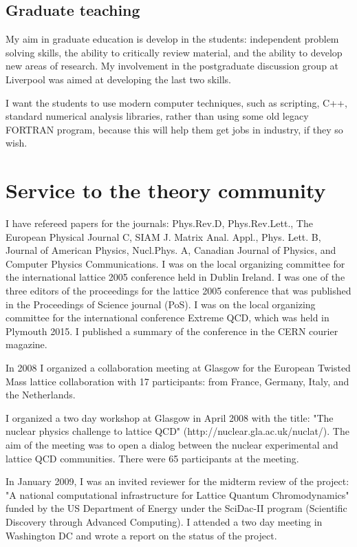 \documentclass[12pt]{article}
\begin{document}
\subsection{Graduate teaching}

My aim in graduate education is develop in the students:
independent problem solving skills, 
the ability to critically review material, and 
the ability to develop new areas of research. My 
involvement in the postgraduate discussion group at Liverpool
was aimed at developing the last two skills.

I want the students to use modern computer
techniques, such as scripting, C++, standard numerical
analysis libraries, rather than using some old legacy
FORTRAN program, because this will help them 
get jobs in industry, if they so wish.



\section{Service to the theory community}

I have refereed papers for the journals: Phys.Rev.D, Phys.Rev.Lett.,
The European Physical Journal C, SIAM J. Matrix Anal. Appl.,
Phys. Lett. B, Journal of American Physics, Nucl.Phys. A, 
Canadian Journal of Physics,
and 
Computer Physics Communications.
I was on the local
organizing committee for the international lattice 2005 conference
held in Dublin Ireland. I was one of the three editors of the
proceedings for the lattice 2005 conference that was published in the
Proceedings of Science journal (PoS). I was on the local organizing
committee for the international conference Extreme QCD, which was held
in Plymouth 2015. I published a summary of the conference in the CERN 
courier magazine.

In 2008 I organized a collaboration meeting at Glasgow for the
European Twisted Mass lattice collaboration with 17 participants: from
France, Germany, Italy, and the Netherlands.

I organized a two day workshop at Glasgow in April 2008 with the
title: "The nuclear physics challenge to lattice QCD"
(http://nuclear.gla.ac.uk/nuclat/). The aim of the meeting was to
open a dialog between the nuclear experimental and lattice
QCD communities. There were 65 participants at the meeting.

In January 2009, I was an invited reviewer for the midterm review of
the project: "A national computational infrastructure for Lattice
Quantum Chromodynamics" funded by the US Department of Energy 
under the SciDac-II program (Scientific Discovery 
through Advanced Computing).
I attended a two day meeting in Washington DC and wrote a report
on the status of the project.
\end{document}
